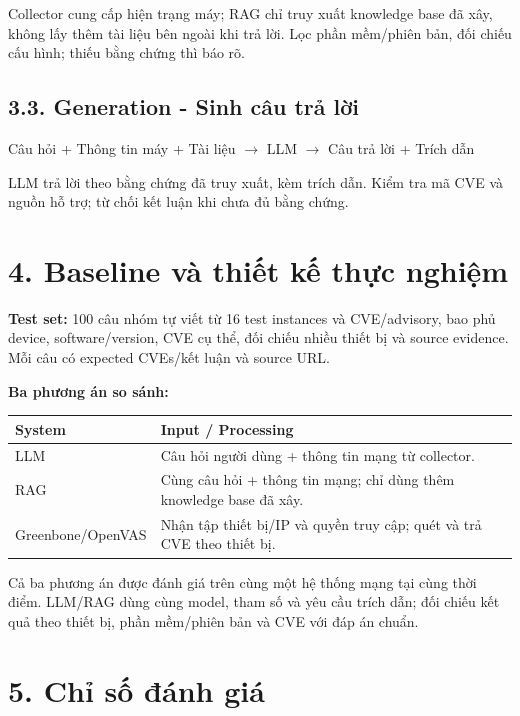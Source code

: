 \documentclass[11pt,a4paper]{article}
\renewcommand{\arraystretch}{1.10}
\newenvironment{flow}{\par\vspace{2pt}\begingroup\centering\small}{\par\endgroup\vspace{2pt}}
\begin{document}
Collector cung cấp hiện trạng máy; RAG chỉ truy xuất knowledge base đã xây, không lấy thêm tài liệu bên ngoài khi trả lời. Lọc phần mềm/phiên bản, đối chiếu cấu hình; thiếu bằng chứng thì báo rõ.

\subsection*{3.3. Generation - Sinh câu trả lời}

\begin{flow}
Câu hỏi + Thông tin máy + Tài liệu $\rightarrow$ LLM $\rightarrow$ Câu trả lời + Trích dẫn
\end{flow}

LLM trả lời theo bằng chứng đã truy xuất, kèm trích dẫn. Kiểm tra mã CVE và nguồn hỗ trợ; từ chối kết luận khi chưa đủ bằng chứng.

\section*{4. Baseline và thiết kế thực nghiệm}

\textbf{Test set:} 100 câu nhóm tự viết từ 16 test instances và CVE/advisory, bao phủ device, software/version, CVE cụ thể, đối chiếu nhiều thiết bị và source evidence. Mỗi câu có expected CVEs/kết luận và source URL.

\textbf{Ba phương án so sánh:}
\begin{flow}
\renewcommand{\arraystretch}{1.22}
\begin{tabularx}{\linewidth}{@{}p{4.0cm}Y@{}}
\toprule
{}
\textbf{System} & \textbf{Input / Processing}\\
\midrule
LLM & Câu hỏi người dùng + thông tin mạng từ collector.\\
RAG & Cùng câu hỏi + thông tin mạng; chỉ dùng thêm knowledge base đã xây.\\
Greenbone/OpenVAS & Nhận tập thiết bị/IP và quyền truy cập; quét và trả CVE theo thiết bị.\\
\bottomrule
\end{tabularx}
\end{flow}

Cả ba phương án được đánh giá trên cùng một hệ thống mạng tại cùng thời điểm. LLM/RAG dùng cùng model, tham số và yêu cầu trích dẫn; đối chiếu kết quả theo thiết bị, phần mềm/phiên bản và CVE với đáp án chuẩn.

\section*{5. Chỉ số đánh giá}
\end{document}
